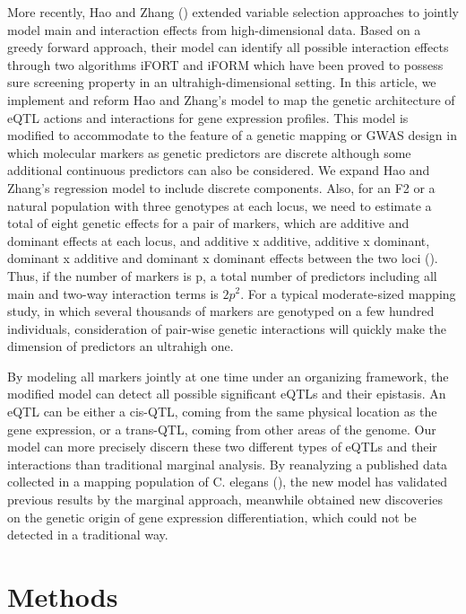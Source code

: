 \documentclass[11pt,]{book}
\theoremstyle{definition}
\theoremstyle{definition}
\theoremstyle{remark}
\begin{document}
More recently, Hao and Zhang (\cite{hao2014interaction}) extended
variable selection approaches to jointly model main and interaction
effects from high-dimensional data. Based on a greedy forward approach,
their model can identify all possible interaction effects through two
algorithms iFORT and iFORM which have been proved to possess sure
screening property in an ultrahigh-dimensional setting. In this article,
we implement and reform Hao and Zhang's model to map the genetic
architecture of eQTL actions and interactions for gene expression
profiles. This model is modified to accommodate to the feature of a
genetic mapping or GWAS design in which molecular markers as genetic
predictors are discrete although some additional continuous predictors
can also be considered. We expand Hao and Zhang's regression model to
include discrete components. Also, for an F2 or a natural population
with three genotypes at each locus, we need to estimate a total of eight
genetic effects for a pair of markers, which are additive and dominant
effects at each locus, and additive x additive, additive x dominant,
dominant x additive and dominant x dominant effects between the two loci
(\cite{kempthorne1968correlation}). Thus, if the number of markers is p,
a total number of predictors including all main and two-way interaction
terms is \(2p^2\). For a typical moderate-sized mapping study, in which
several thousands of markers are genotyped on a few hundred individuals,
consideration of pair-wise genetic interactions will quickly make the
dimension of predictors an ultrahigh one.

By modeling all markers jointly at one time under an organizing
framework, the modified model can detect all possible significant eQTLs
and their epistasis. An eQTL can be either a cis-QTL, coming from the
same physical location as the gene expression, or a trans-QTL, coming
from other areas of the genome. Our model can more precisely discern
these two different types of eQTLs and their interactions than
traditional marginal analysis. By reanalyzing a published data collected
in a mapping population of C. elegans (\cite{rockman2010selection}), the
new model has validated previous results by the marginal approach,
meanwhile obtained new discoveries on the genetic origin of gene
expression differentiation, which could not be detected in a traditional
way.

\section{Methods}\label{methods}
\end{document}
